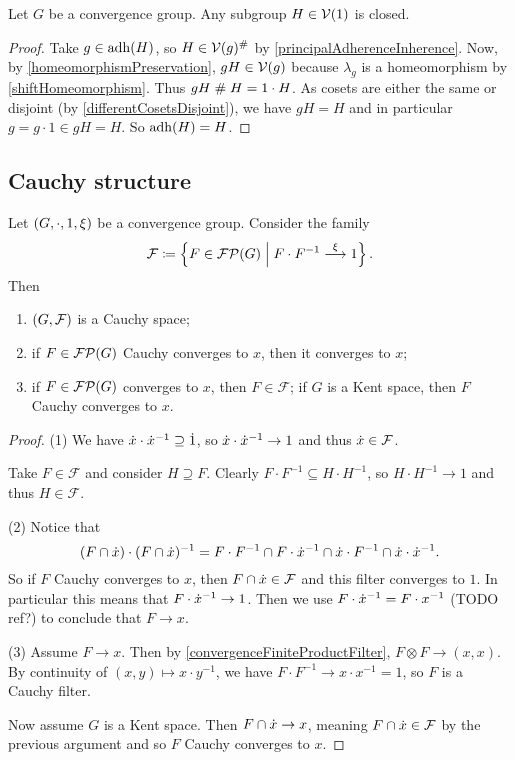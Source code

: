 \begin{proposition}
Let $G$ be a convergence group. Any subgroup $H\in\operatorname{\mathcal{V}}(1)$ is closed.
\end{proposition}
\begin{proof}
Take $g\in \operatorname{adh}(H)$, so $H\in \operatorname{\mathcal{V}}(g)^{\mathrel{\#}}$ by \ref{principalAdherenceInherence}. Now, by \ref{homeomorphismPreservation}, $gH\in \operatorname{\mathcal{V}}(g)$ because $\lambda_g$ is a homeomorphism by \ref{shiftHomeomorphism}. Thus $gH \mathrel{\#} H = 1\cdot H$. As cosets are either the same or disjoint (by \ref{differentCosetsDisjoint}), we have $gH = H$ and in particular $g = g\cdot 1 \in gH = H$. So $\operatorname{adh}(H) = H$.
\end{proof}

\subsection{Cauchy structure}
\begin{proposition} \label{groupCauchyStructure}
Let $\left( G, \cdot, 1, \xi \right)$ be a convergence group. Consider the family
\[ \mathcal{F} \coloneqq \left\{ F\in \operatorname{\mathcal{FP}}(G) \;\middle|\; F\cdot F^{-1} \overset{\xi}{\longrightarrow} 1 \right\}. \]
Then
\begin{enumerate}
\item $\left( G, \mathcal{F} \right)$ is a Cauchy space;
\item if $F\in \operatorname{\mathcal{FP}}(G)$ Cauchy converges to $x$, then it converges to $x$;
\item if $F\in \operatorname{\mathcal{FP}}(G)$ converges to $x$, then $F\in \mathcal{F}$; if $G$ is a Kent space, then $F$ Cauchy converges to $x$.
\end{enumerate}
\end{proposition}
\begin{proof}
(1) We have $\dot{x}\cdot \dot{x}^{-1} \supseteq \dot{1}$, so $\dot{x}\cdot \dot{x}^{-1} \to 1$ and thus $\dot{x} \in \mathcal{F}$.

Take $F\in \mathcal{F}$ and consider $H\supseteq F$. Clearly $F\cdot F^{-1} \subseteq H\cdot H^{-1}$, so $H\cdot H^{-1} \to 1$ and thus $H\in \mathcal{F}$.

(2) Notice that
\[ (F\cap \dot{x})\cdot(F\cap \dot{x})^{-1} = F\cdot F^{-1} \cap F\cdot \dot{x}^{-1} \cap \dot{x}\cdot F^{-1} \cap \dot{x}\cdot\dot{x}^{-1}. \]
So if $F$ Cauchy converges to $x$, then $F\cap\dot{x} \in \mathcal{F}$ and this filter converges to $1$. In particular this means that $F\cdot\dot{x}^{-1} \to 1$. Then we use $F\cdot\dot{x}^{-1} = F\cdot x^{-1}$ (TODO ref?) to conclude that $F \to x$.

(3) Assume $F\to x$. Then by \ref{convergenceFiniteProductFilter}, $F\otimes F \to (x,x)$. By continuity of $(x,y)\mapsto x\cdot y^{-1}$, we have $F\cdot F^{-1}\to x\cdot x^{-1} = 1$, so $F$ is a Cauchy filter.

Now assume $G$ is a Kent space. Then $F\cap \dot{x} \to x$, meaning $F\cap \dot{x} \in \mathcal{F}$ by the previous argument and so $F$ Cauchy converges to $x$.
\end{proof}


